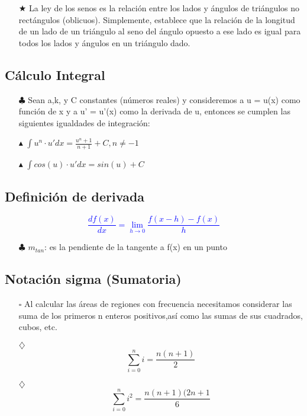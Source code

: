 \documentclass[a4peper, 12pt]{article}
\begin{document}
\begin{itemize}
    \item[$\bigstar$] La ley de los senos es la relación entre los lados y ángulos de triángulos no rectángulos (oblicuos). Simplemente, establece que la relación de la longitud de un lado de un triángulo al seno del ángulo opuesto a ese lado es igual para todos los lados y ángulos en un triángulo dado.
\end{itemize}

\subsection{Cálculo Integral}

\begin{itemize}
    \item[$\clubsuit$] Sean a,k, y C constantes (números reales) y consideremos a u = u(x) como función de x y a u' = u'(x) como la derivada de u, entonces se cumplen las siguientes igualdades de integración:
\end{itemize}
\begin{itemize}
    \item[$\blacktriangle$] $\int u^n \cdot u'dx= \frac{u^n+1}{n+1}+C, n\neq
-1$
    \item[$\blacktriangle$] $\int cos(u) \cdot u'dx = sin (u) + C $
\end{itemize}

\subsection{Definición de derivada}

\textcolor{blue}{$$\frac{df(x)}{dx}= \lim_{h \rightarrow 0} \frac{f(x-h)-f(x)}{h}$$}
\begin{itemize}
    \item[$\clubsuit$] $m_{tan}$: es la pendiente de la tangente a f(x) en un punto
\end{itemize}

\subsection{Notación sigma (Sumatoria)}
\begin{itemize}
    \item[$\square$] Al calcular las áreas de regiones con frecuencia necesitamos considerar las suma de los primeros n enteros positivos,así como las sumas de sus cuadrados, cubos, etc. 
\end{itemize}
\begin{itemize}
    \item[$\diamondsuit$] $$\sum_{i=0}^{n} i = \frac{n (n+1)}{2}$$
    \item[$\diamondsuit$] $$\sum_{i=0}^{n} i^2 = \frac{n(n+1)(2n+1}{6}$$
\end{itemize}
\end{document}
